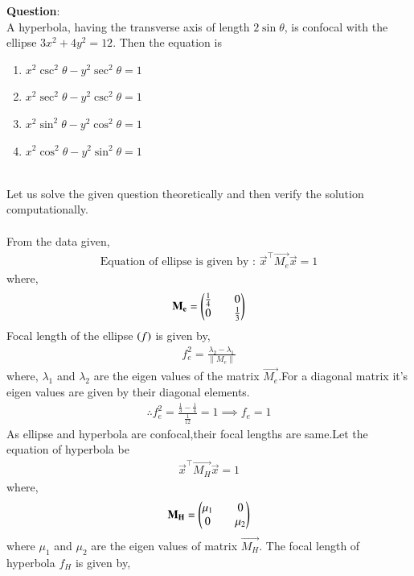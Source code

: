 \documentclass[journal]{IEEEtran}
\begin{document}
\textbf{Question}:\\
A hyperbola, having the transverse axis of length $2\sin{\theta}$, is confocal with the ellipse $3x^2+4y^2=12$. Then the equation is
\begin{multicols}{2}
\begin{enumerate}
    \item $x^2\csc^2{\theta}-y^2\sec^2{\theta}=1$
    \item $x^2\sec^2{\theta}-y^2\csc^2{\theta}=1$
    \item $x^2\sin^2{\theta}-y^2\cos^2{\theta}=1$
    \item $x^2\cos^2{\theta}-y^2\sin^2{\theta}=1$
\end{enumerate}
\end{multicols}
\solution \\
Let us solve the given question theoretically and then verify the solution computationally.\\
\\
From the data given,
\begin{align}
    \text{Equation of ellipse is given by : }\vec{x}^{\top}\vec{M_e}\vec{x}=1
\end{align}
where,
\begin{align}
    \mathbf{M_e}=\begin{pmatrix}\tfrac{1}{4}&&0\\0&&\tfrac{1}{3}\end{pmatrix}
\end{align}
Focal length of the ellipse $\left(f\right)$ is given by,
\begin{align}
    f_e^2=\frac{\lambda_2-\lambda_1}{\|M_e\|}
\end{align}
where, $\lambda_1$ and $\lambda_2$ are the eigen values of the matrix $\vec{M_e}$.For a diagonal matrix it's eigen values are given by their diagonal elements.
\begin{align}
    \therefore f_e^2=\frac{\frac{1}{3}-\frac{1}{4}}{\frac{1}{12}}=1
    \implies f_e=1
\end{align}
As ellipse and hyperbola are confocal,their focal lengths are same.Let the equation of hyperbola be
\begin{align}
    \vec{x}^{\top}\vec{M_H}\vec{x}=1
\end{align}
where,
\begin{align}
    \mathbf{M_H}=\begin{pmatrix}\mu_1&&0\\0&&\mu_2\end{pmatrix}
\end{align}
where $\mu_1$ and $\mu_2$ are the eigen values of matrix $\vec{M_H}$.
\newpage
\vspace*{0.25cm}
The focal length of hyperbola $f_H$ is given by,
\end{document}
